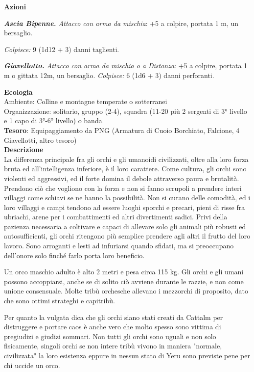 \begin{multicols}{2}
\textbf{Azioni}

\textit{\textbf{Ascia Bipenne.} Attacco con arma da mischia}: +5 a colpire, portata 1 m, un bersaglio.

\textit{Colpisce:} 9 (1d12 + 3) danni taglienti.

\textit{\textbf{Giavellotto.} Attacco con arma da mischia o a Distanza}: +5 a colpire, portata 1 m o gittata 12m, un bersaglio. \textit{Colpisce:} 6 (1d6 + 3) danni perforanti.

\textbf{Ecologia}\\
Ambiente: Colline e montagne temperate o sotterranei\\
Organizzazione: solitario, gruppo (2-4), squadra (11-20 più 2 sergenti di 3° livello e 1 capo di 3°-6° livello) o banda \\
\textbf{Tesoro}: Equipaggiamento da PNG (Armatura di Cuoio Borchiato, Falcione, 4 Giavellotti, altro tesoro)\\
\textbf{Descrizione}\\
La differenza principale fra gli orchi e gli umanoidi civilizzati, oltre alla loro forza bruta ed all'intelligenza inferiore, è il loro carattere. Come cultura, gli orchi sono violenti ed aggressivi, ed il forte domina il debole attraverso paura e brutalità. Prendono ciò che vogliono con la forza e non si fanno scrupoli a prendere interi villaggi come schiavi se ne hanno la possibilità. Non si curano delle comodità, ed i loro villaggi e campi tendono ad essere luoghi sporchi e precari, pieni di risse fra ubriachi, arene per i combattimenti ed altri divertimenti sadici. Privi della pazienza necessaria a coltivare e capaci di allevare solo gli animali più robusti ed autosufficienti, gli orchi ritengono più semplice prendere agli altri il frutto del loro lavoro. Sono arroganti e lesti ad infuriarsi quando sfidati, ma si preoccupano dell'onore solo finché farlo porta loro beneficio.

Un orco maschio adulto è alto 2 metri e pesa circa 115 kg. Gli orchi e gli umani possono accoppiarsi, anche se di solito ciò avviene durante le razzie, e non come unione consensuale. Molte tribù orchesche allevano i mezzorchi di proposito, dato che sono ottimi strateghi e capitribù.

Per quanto la vulgata dica che gli orchi siano stati creati da Cattalm per distruggere e portare caos è anche vero che molto spesso sono vittima di pregiudizi e giudizi sommari. Non tutti gli orchi sono uguali e non solo fisicamente, singoli orchi se non intere tribù vivono in maniera "normale, civilizzata" la loro esistenza eppure in nessun stato di Yeru sono previste pene per chi uccide un orco.


\end{multicols}
